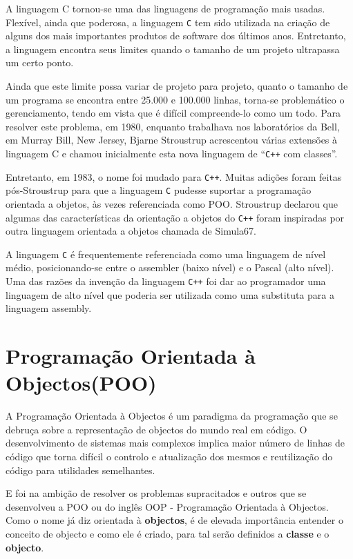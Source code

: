 \documentclass[a4paper,12pt]{article}
\begin{document}
A linguagem C tornou-se uma das linguagens de programação mais 
usadas. Flexível, ainda que poderosa, a linguagem \texttt{C} tem sido utilizada na criação 
de alguns dos mais importantes produtos de software dos últimos anos. Entretanto, a 
linguagem encontra seus limites quando o tamanho de um projeto ultrapassa um 
certo ponto.

Ainda que este limite possa variar de projeto para projeto, quanto o 
tamanho de um programa se encontra entre 25.000 e 100.000 linhas, torna-se 
problemático o gerenciamento, tendo em vista que é difícil compreende-lo como um 
todo. Para resolver este problema, em 1980, enquanto trabalhava nos laboratórios 
da Bell, em Murray Bill, New Jersey, Bjarne Stroustrup acrescentou várias extensões 
à linguagem C e chamou inicialmente esta nova linguagem de “\texttt{C++} com classes”.

Entretanto, em 1983, o nome foi mudado para \texttt{C++}. 
Muitas adições foram feitas pós-Stroustrup para que a linguagem \texttt{C}
pudesse suportar a programação orientada a objetos, às vezes referenciada como 
POO. Stroustrup declarou que algumas das características da orientação a objetos 
do \texttt{C++} foram inspiradas por outra linguagem orientada a objetos chamada de 
Simula67. 

A linguagem \texttt{C} é frequentemente referenciada como uma linguagem de 
nível médio, posicionando-se entre o assembler (baixo nível) e o Pascal (alto nível). 
Uma das razões da invenção da linguagem \texttt{C++} foi dar ao programador uma linguagem 
de alto nível que poderia ser utilizada como uma substituta para a linguagem 
assembly. 
\newpage
\section{Programação Orientada à Objectos(POO)}
A Programação Orientada à Objectos é um paradigma da programação que se debruça sobre a representação
de objectos do mundo real em código. O desenvolvimento de sistemas mais complexos implica maior número
de linhas de código que torna difícil o controlo e atualização dos mesmos e reutilização do código para 
utilidades semelhantes. 

E foi na ambição de resolver os problemas supracitados e outros que se desenvolveu a POO ou do inglês OOP -
 Programação Orientada à Objectos.
 Como o nome já diz orientada à \textbf{objectos}, é de elevada importância entender o conceito de objecto e como ele é criado, para 
 tal serão definidos a \textbf{classe} e o \textbf{objecto}.
\end{document}
